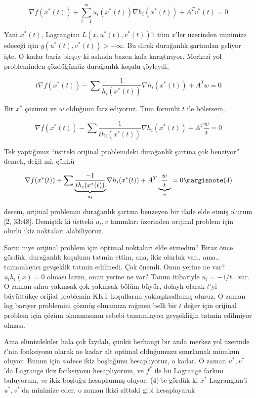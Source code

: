 \documentclass[12pt,fleqn]{article}\usepackage{../../common}
\begin{document}
$$
\nabla f(x^\ast(t)) + \sum_{i=1}^{m} u_i (x^\ast(t)) \nabla h_i(x^\ast(t)) + 
A^T v^\ast(t) = 0
$$


Yani $x^\ast(t)$, Lagrangian $L(x,u^\ast(t),v^\ast(t))$'i tüm $x$'ler üzerinden
minimize edeceği için $g(u^\ast(t),v^\ast(t)) > -\infty$. Bu direk durağanlık
şartından geliyor işte. O kadar bariz birşey ki aslında bazen kafa
karıştırıyor. Merkezi yol probleminden çözdüğümüz durağanlık koşulu
şöyleydi,

$$
t \nabla f(x^\ast(t)) - \sum \frac{1}{h_i(x^\ast(t))} \nabla h_i(x^\ast(t)) + A^T w= 0
$$

Bir $x^\ast$ çözümü ve $w$ olduğunu farz ediyoruz. Tüm formülü $t$ ile
bölersem,

$$
\nabla f(x^\ast(t)) - \sum \frac{1}{t h_i(x^\ast(t))} \nabla h_i(x^\ast(t)) + A^T \frac{w}{t}= 0
$$

Tek yaptığımız ``üstteki orijinal problemdeki durağanlık şartına çok
benziyor'' demek, değil mi, çünkü 

$$
\nabla f(x^\ast(t)) +
\sum \underbrace{\frac{-1}{t h_i(x^\ast(t))}}_{u_i} \nabla h_i(x^\ast(t)) + 
A^T \underbrace{\frac{w}{t}}_{v}= 0 
\mlabel{4}
$$

desem, orijinal problemin durağanlık şartına benzeyen bir ifade elde etmiş
olurum [2, 33:48]. Demiştik ki üstteki $u_i,v$ tanımları üzerinden orijinal
problem için olurlu ikiz noktaları alabiliyoruz. 

Soru: niye orijinal problem için optimal noktaları elde etmedim? Biraz önce
gördük, durağanlık koşulunu tatmin ettim, ana, ikiz olurluk
var.. ama.. tamamlayıcı gevşeklik tatmin edilmedi. Çok önemli. Onun yerine
ne var? $u_i h_i (x) = 0$ olması lazım, onun yerine ne var? Tanım
itibariyle $u_i = -1/t ..$ var. O zaman sıfıra yakınsak çok yakınsak bölüm
büyür, dolaylı olarak $t$'yi büyüttükçe orijial problemin KKT koşullarını
yaklaşıksallamış oluruz. O zaman log bariyer problemini çözmüş olmamıza
rağmen belli bir $t$ değer için orijinal problem için çözüm olmamasının
sebebi tamamlayıcı gevşekliğin tatmin edilmiyor olması.

Ama elimizdekiler hala çok faydalı, çünkü herhangi bir anda merkez yol
üzerinde $t$'nin fonksiyonu olarak ne kadar alt optimal olduğumuzu
sınırlamak mümkün oluyor. Bunun için sadece ikiz boşluğunu hesaplıyoruz, o
kadar. O zaman $u^\ast,v^\ast$'da Lagrange ikiz fonksiyonu hesaplıyorum, ve $f^\ast$
ile bu Lagrange farkını buluyorum, ve ikiz boşluğu hesaplanmış oluyor. 
(4)'te gördük ki $x^\ast$ Lagrangian'i $u^\ast,v^\ast$'da minimize eder, o zaman
ikizi alttaki gibi hesaplayarak 
\end{document}
